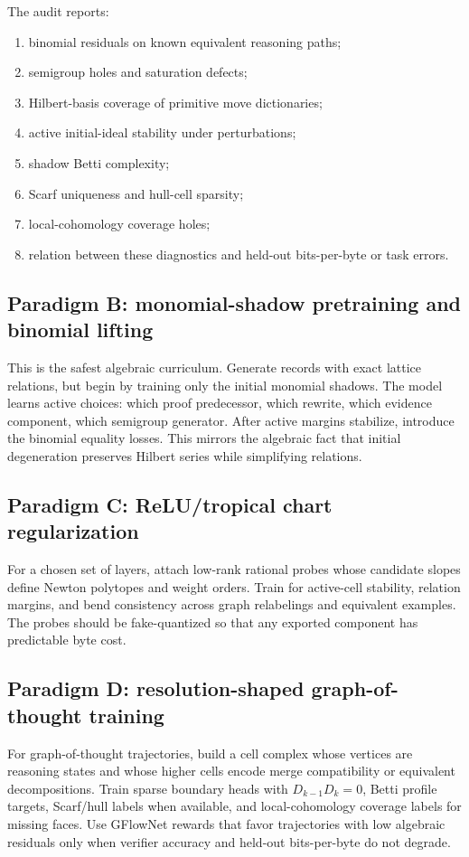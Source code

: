\documentclass[11pt]{article}
\theoremstyle{definition}
\begin{document}
The audit reports:
\begin{enumerate}[leftmargin=*]
\item binomial residuals on known equivalent reasoning paths;
\item semigroup holes and saturation defects;
\item Hilbert-basis coverage of primitive move dictionaries;
\item active initial-ideal stability under perturbations;
\item shadow Betti complexity;
\item Scarf uniqueness and hull-cell sparsity;
\item local-cohomology coverage holes;
\item relation between these diagnostics and held-out bits-per-byte or task errors.
\end{enumerate}

\subsection{Paradigm B: monomial-shadow pretraining and binomial lifting}
This is the safest algebraic curriculum.  Generate records with exact lattice relations, but begin by training only the initial monomial shadows.  The model learns active choices: which proof predecessor, which rewrite, which evidence component, which semigroup generator.  After active margins stabilize, introduce the binomial equality losses.  This mirrors the algebraic fact that initial degeneration preserves Hilbert series while simplifying relations.

\subsection{Paradigm C: ReLU/tropical chart regularization}
For a chosen set of layers, attach low-rank rational probes whose candidate slopes define Newton polytopes and weight orders.  Train for active-cell stability, relation margins, and bend consistency across graph relabelings and equivalent examples.  The probes should be fake-quantized so that any exported component has predictable byte cost.

\subsection{Paradigm D: resolution-shaped graph-of-thought training}
For graph-of-thought trajectories, build a cell complex whose vertices are reasoning states and whose higher cells encode merge compatibility or equivalent decompositions.  Train sparse boundary heads with \(D_{k-1}D_k=0\), Betti profile targets, Scarf/hull labels when available, and local-cohomology coverage labels for missing faces.  Use GFlowNet rewards that favor trajectories with low algebraic residuals only when verifier accuracy and held-out bits-per-byte do not degrade.
\end{document}
